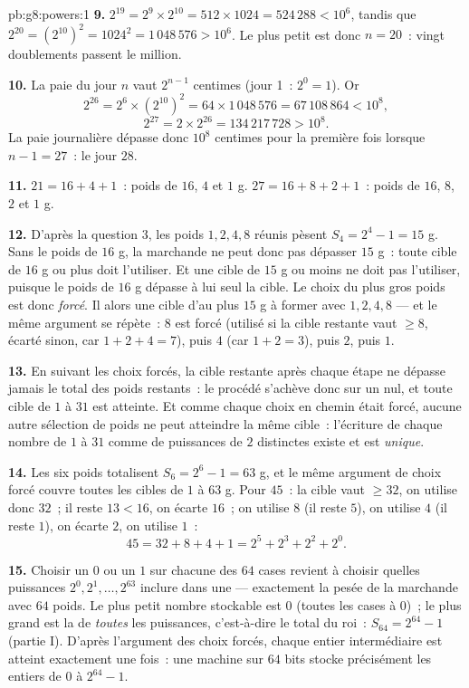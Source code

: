 \begin{solution}{pb:g8:powers:1}
\textbf{9.} $2^{19} = 2^9 \times 2^{10} = 512 \times 1024 =
524\,288 < 10^6$, tandis que
$2^{20} = \left(2^{10}\right)^2 = 1024^2 = 1\,048\,576 > 10^6$. Le
plus petit  est donc $n = 20$~: vingt doublements passent le
million.

\textbf{10.} La paie du jour $n$ vaut $2^{n-1}$ centimes (jour 1~:
$2^0 = 1$). Or
\[
2^{26} = 2^6 \times \left(2^{10}\right)^2
= 64 \times 1\,048\,576 = 67\,108\,864 < 10^8,
\]
\[
2^{27} = 2 \times 2^{26} = 134\,217\,728 > 10^8 .
\]
La paie journalière dépasse donc $10^8$ centimes pour la première
fois lorsque $n - 1 = 27$~: le jour $28$.

\textbf{11.} $21 = 16 + 4 + 1$~: poids de $16$, $4$ et $1$ g.
$27 = 16 + 8 + 2 + 1$~: poids de $16$, $8$, $2$ et $1$ g.

\textbf{12.} D'après la question 3, les poids $1, 2, 4, 8$ réunis
pèsent $S_4 = 2^4 - 1 = 15$ g. Sans le poids de $16$ g, la
marchande ne peut donc pas dépasser $15$ g~: toute cible de $16$ g
ou plus doit l'utiliser. Et une cible de $15$ g ou moins ne doit pas
l'utiliser, puisque le poids de $16$ g dépasse à lui seul la cible.
Le choix du plus gros poids est donc \emph{forcé}. Il  alors une
cible d'au plus $15$ g à former avec $1, 2, 4, 8$ --- et le même
argument se répète~: $8$ est forcé (utilisé si la cible restante
vaut $\geq 8$, écarté sinon, car $1 + 2 + 4 = 7$), puis $4$ (car
$1 + 2 = 3$), puis $2$, puis $1$.

\textbf{13.} En suivant les choix forcés, la cible restante après
chaque étape ne dépasse jamais le total des poids restants~: le
procédé s'achève donc sur un  nul, et toute cible de $1$ à $31$
est atteinte. Et comme chaque choix en chemin était forcé, aucune
autre sélection de poids ne peut atteindre la même cible~: l'écriture
de chaque nombre de $1$ à $31$ comme  de puissances de $2$
distinctes existe et est \emph{unique}.

\textbf{14.} Les six poids totalisent $S_6 = 2^6 - 1 = 63$ g, et le
même argument de choix forcé couvre toutes les cibles de $1$ à
$63$ g. Pour $45$~: la cible vaut $\geq 32$, on utilise donc $32$~;
il reste $13 < 16$, on écarte $16$~; on utilise $8$ (il reste $5$),
on utilise $4$ (il reste $1$), on écarte $2$, on utilise $1$~:
\[
45 = 32 + 8 + 4 + 1 = 2^5 + 2^3 + 2^2 + 2^0 .
\]

\textbf{15.} Choisir un $0$ ou un $1$ sur chacune des $64$ cases
revient à choisir quelles puissances $2^0, 2^1, \dots, 2^{63}$
inclure dans une  --- exactement la pesée de la marchande avec
$64$ poids. Le plus petit nombre stockable est $0$ (toutes les cases
à $0$)~; le plus grand est la  de \emph{toutes} les puissances,
c'est-à-dire le total du roi~: $S_{64} = 2^{64} - 1$ (partie I).
D'après l'argument des choix forcés, chaque entier intermédiaire est
atteint exactement une fois~: une machine sur $64$ bits stocke
précisément les entiers de $0$ à $2^{64} - 1$.
\end{solution}
